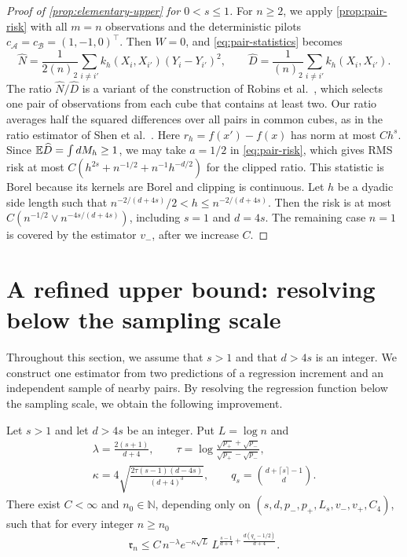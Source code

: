 \begin{proof}[Proof of \cref{prop:elementary-upper} for $0<s\le1$]
For $n\ge2$, we apply \cref{prop:pair-risk} with all $m=n$
observations and the deterministic pilots $c_{\mathcal A}=c_{\mathcal B}=(1,-1,0)^\top$.
Then $W=0$, and \eqref{eq:pair-statistics} becomes
\[
 \widehat N=\frac1{2(n)_2}\sum_{i\ne i'}
 k_h(X_i,X_{i'})(Y_i-Y_{i'})^2,\qquad
 \widehat D=\frac1{(n)_2}\sum_{i\ne i'}k_h(X_i,X_{i'}).
\]
The ratio $\widehat N/\widehat D$ is a variant of the construction of
Robins et al.\ \cite[Section~4]{RobinsEtAl2008}, which selects one pair
of observations from each cube that contains at least two. Our ratio averages
half the squared differences over all pairs in common cubes, as in the
ratio estimator of Shen et al.\ \cite{ShenGaoWittenHan2020}.
Here $r_h=f(x')-f(x)$ has norm at most $Ch^s$. Since
$\mathbb E\widehat D=\int dM_h\ge1$, we may take $a=1/2$ in
\eqref{eq:pair-risk}, which gives RMS risk at most
$C(h^{2s}+n^{-1/2}+n^{-1}h^{-d/2})$ for the clipped ratio.
This statistic is Borel because its kernels are Borel and clipping
is continuous. Let $h$ be a dyadic side length such that
$n^{-2/(d+4s)}/2<h\le n^{-2/(d+4s)}$. Then the risk is at most
$C(n^{-1/2}\vee n^{-4s/(d+4s)})$, including $s=1$ and $d=4s$.
The remaining case $n=1$ is covered by the estimator $v_-$, after we
increase $C$.
\end{proof}
\chapter{A refined upper bound: resolving below the sampling scale}
\label{sec:upper-sharp}

Throughout this section, we assume that $s>1$ and that $d>4s$ is an
integer. We construct one estimator from two predictions of a regression
increment and an independent sample of nearby pairs. By resolving the
regression function below the sampling scale, we obtain the following
improvement.

\begin{theorem}\label{thm:upper-sharp}
Let $s>1$ and let $d>4s$ be an integer. Put $L=\log n$ and
\[
 \begin{gathered}
 \lambda=\frac{2(s+1)}{d+4},
 \qquad
 \tau=\log\frac{\sqrt{p_+}+\sqrt{p_-}}{\sqrt{p_+}-\sqrt{p_-}},
 \\
 \kappa=4\sqrt{\frac{2\tau(s-1)(d-4s)}{(d+4)^3}},
 \qquad
 q_s=\binom{d+\lceil s\rceil-1}{d}.
 \end{gathered}
\]
There exist $C<\infty$ and $n_0\in\mathbb N$, depending only on
$(s,d,p_-,p_+,L_s,v_-,v_+,C_4)$, such that for every integer
$n\ge n_0$
\begin{equation}\label{eq:upper-sharp}
 \mathfrak r_n
 \le C\,n^{-\lambda}e^{-\kappa\sqrt L}\,
 L^{\frac{s-1}{d+4}+\frac{d(q_s-1/2)}{d+4}} .
\end{equation}
\end{theorem}

